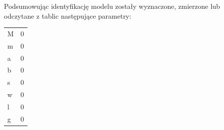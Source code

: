 \documentclass[12pt]{article}
\begin{document}
\newpage

Podsumowując identyfikację modelu zostały wyznaczone, zmierzone lub odczytane z
tablic następujące parametry:

\begin{table}[!htb]
    \centering
    \begin{tabular}{|l|l|}
        \hline
        M & 0 \\
        m & 0 \\
        a & 0 \\
        b & 0 \\
        s & 0 \\
        w & 0 \\
        l & 0 \\
        g & 0 \\
        \hline
    \end{tabular}
\end{table}
\end{document}
